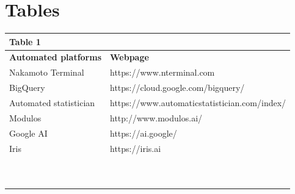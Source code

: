 \documentclass[english,12pt]{article}
\begin{document}
\section{Tables}
\begin{center}
\begin{tabular}{  p{5cm}  |  p{8cm} }
\hline
{\bf Table 1} & \textbf{}\\  \hline
  \textbf{Automated platforms} & \textbf{Webpage}\\  \hline
        Nakamoto Terminal & https://www.nterminal.com \\ \hline
        BigQuery & https://cloud.google.com/bigquery/ \\ \hline
        Automated statistician  & https://www.automaticstatistician.com/index/ \\ \hline
        Modulos & http://www.modulos.ai/ \\ \hline
        Google AI & https://ai.google/ \\ \hline        
        Iris & https://iris.ai \\ \hline
         & \\ \hline 
         & \\ \hline        
         & \\ \hline
         & \\ \hline
         & \\ \hline
         & \\ \hline
         & \\ \hline
         & \\ \hline
         & \\ \hline
         & \\ \hline
        
\bottomrule
\end{tabular}
\end{center}

\newpage
\end{document}
